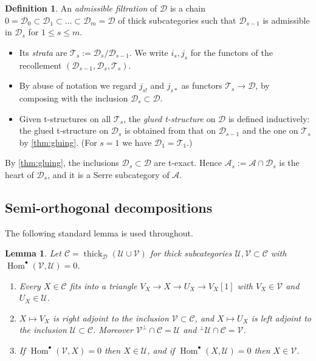 \documentclass[11pt,reqno]{amsart}
\theoremstyle{plain}
\newtheorem{lemma}[theorem]{Lemma}
\theoremstyle{definition}
\newtheorem{definition}[theorem]{Definition}
\theoremstyle{remark}
\DeclareMathOperator{\Hom}{Hom}
\newcommand{\thick}[2][\cD]{\operatorname{thick}_{#1}(#2)}
\newcommand{\cD}{\mathcal{D}}
\newcommand{\cA}{\mathcal{A}}
\newcommand{\cT}{\mathcal{T}}
\newcommand{\cC}{\mathcal{C}}
\newcommand{\cU}{\mathcal{U}}
\newcommand{\cV}{\mathcal{V}}
\begin{document}
\begin{definition}\label{def:adm-filtration}
An \emph{admissible filtration} of $\cD$ is a chain $0=\cD_0\subset\cD_1\subset\dots\subset\cD_m=\cD$ of thick subcategories such that $\cD_{s-1}$ is admissible in $\cD_s$ for $1\le s\le m$.
\begin{itemize}
\item Its \emph{strata} are $\cT_s:=\cD_s/\cD_{s-1}$. We write $i_s,j_s$ for the functors of the recollement $(\cD_{s-1},\cD_s,\cT_s)$.
\item By abuse of notation we regard $j_{s!}$ and $j_{s*}$ as functors $\cT_s\to\cD$, by composing with the inclusion $\cD_s\subset\cD$.
\item Given t-structures on all $\cT_s$, the \emph{glued t-structure} on $\cD$ is defined inductively: the glued t-structure on $\cD_s$ is obtained from that on $\cD_{s-1}$ and the one on $\cT_s$ by \cref{thm:gluing}. (For $s=1$ we have $\cD_1=\cT_1$.)
\end{itemize}
By \cref{thm:gluing}, the inclusions $\cD_{s}\subset\cD$ are t-exact. Hence $\cA_s:=\cA\cap\cD_s$ is the heart of $\cD_s$, and it is a Serre subcategory of $\cA$.
\end{definition}

\subsection{Semi-orthogonal decompositions}
The following standard lemma is used throughout.

\begin{lemma}\label{lem:sod}
Let $\cC=\thick{\cU\cup\cV}$ for thick subcategories $\cU,\cV\subset\cC$ with $\Hom^\bullet(\cV,\cU)=0$.
\begin{enumerate}
\item Every $X\in\cC$ fits into a triangle $V_X\to X\to U_X\to V_X[1]$ with $V_X\in\cV$ and $U_X\in\cU$.
\item $X\mapsto V_X$ is right adjoint to the inclusion $\cV\subset\cC$, and $X\mapsto U_X$ is left adjoint to the inclusion $\cU\subset\cC$. Moreover $\cV^\perp\cap\cC=\cU$ and ${}^\perp\cU\cap\cC=\cV$.
\item If $\Hom^\bullet(\cV,X)=0$ then $X\in\cU$, and if $\Hom^\bullet(X,\cU)=0$ then $X\in\cV$.
\end{enumerate}
\end{lemma}
\end{document}
